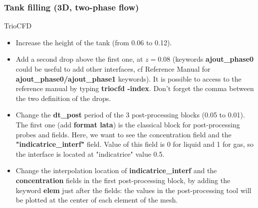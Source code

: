\documentclass[10pt, hyperref={unicode=true,pdfusetitle, bookmarks=true,bookmarksnumbered=false,bookmarksopen=false, breaklinks=false,pdfborder={0 0 1},backref=true,colorlinks=true,linkcolor=darkblue,pageanchor}]{beamer}
\begin{document}
\begin{frame}
\frametitle{Tank filling (3D, two-phase flow)}
\begin{block}{TrioCFD}

\begin{itemize}
\item Increase the height of the tank (from 0.06 to 0.12).

\item Add a second drop above the first one, at $z=0.08$ (keywords \textbf{ajout\_phase0} could be useful to add other interfaces, cf Reference Manual for \textbf{ajout\_phase0/ajout\_phase1} keywords). It is possible to access to the reference manual by typing \textbf{triocfd -index}. Don't forget the comma between the two definition of the drops.

\item Change the \textbf{dt\_post} period of the 3 post-processing blocks (0.05 to 0.01). The first one (add \textbf{format lata}) is the classical block for post-processing probes and fields. Here, we want to see the concentration field and the \textbf{"indicatrice\_interf"} field. Value of this field is 0 for liquid and 1 for gas, so the interface is located at "indicatrice" value 0.5.

\item Change the interpolation location of \textbf{indicatrice\_interf} and the \textbf{concentration} fields in the first post-processing block, by adding the keyword \textbf{elem} just after the fields: the values in the post-processing tool will be plotted at the center of each element of the mesh.
\end{itemize}

\end{block}
\end{frame}
\end{document}
